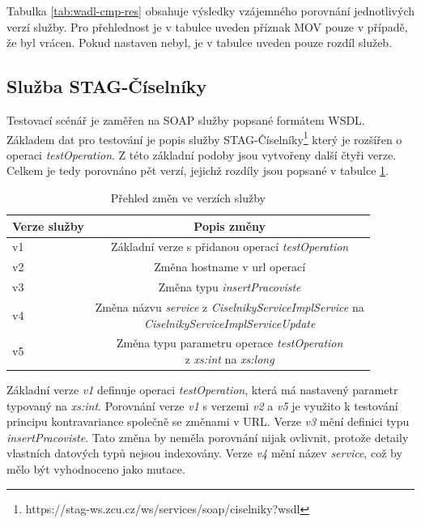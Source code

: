 \documentclass[czech,DP]{thesiskiv}
\begin{document}
Tabulka \ref{tab:wadl-cmp-res} obsahuje výsledky vzájemného porovnání jednotlivých verzí služby. Pro přehlednost je v tabulce uveden příznak MOV pouze v případě, že byl vrácen. Pokud nastaven nebyl, je v tabulce uveden pouze rozdíl služeb. 

\subsection{Služba STAG-Číselníky}

Testovací scénář je zaměřen na SOAP služby popsané formátem WSDL. Základem dat pro testování je popis služby STAG-Číselníky\footnote{https://stag-ws.zcu.cz/ws/services/soap/ciselniky?wsdl} který je rozšířen o operaci \textit{testOperation}. Z této základní podoby jsou vytvořeny další čtyři verze. Celkem je tedy porovnáno pět verzí, jejichž rozdíly jsou popsané v tabulce \ref{tab:wsdl-diffs}.

\begin{table}[h]
	\centering
	\begin{tabular}{|l|c|}
		\hline
		Verze služby & Popis změny \\
		\hline
		\hline
		v1 & Základní verze s přidanou operací \textit{testOperation} \\
		\hline
		v2 & Změna hostname v url operací \\
		\hline
		v3 & Změna typu \textit{insertPracoviste} \\
		\hline
		v4 & \makecell{Změna názvu \textit{service} z \textit{CiselnikyServiceImplService} na \\ \textit{CiselnikyServiceImplServiceUpdate}}  \\
		\hline
		v5 & \makecell{Změna typu parametru operace \textit{testOperation} \\
		z \textit{xs:int} na \textit{xs:long}} \\ \hline
	\end{tabular}
	\caption{Přehled změn ve verzích služby}
	\label{tab:wsdl-diffs}
\end{table}

Základní verze \textit{v1} definuje operaci \textit{testOperation}, která má nastavený parametr typovaný na \textit{xs:int}. Porovnání verze \textit{v1} s verzemi \textit{v2} a \textit{v5} je využito k testování principu kontravariance společně se změnami v URL. Verze \textit{v3} mění definici typu \textit{insertPracoviste}. Tato změna by neměla porovnání nijak ovlivnit, protože detaily vlastních datových typů nejsou indexovány. Verze \textit{v4} mění název \textit{service}, což by mělo být vyhodnoceno jako mutace.
\end{document}
